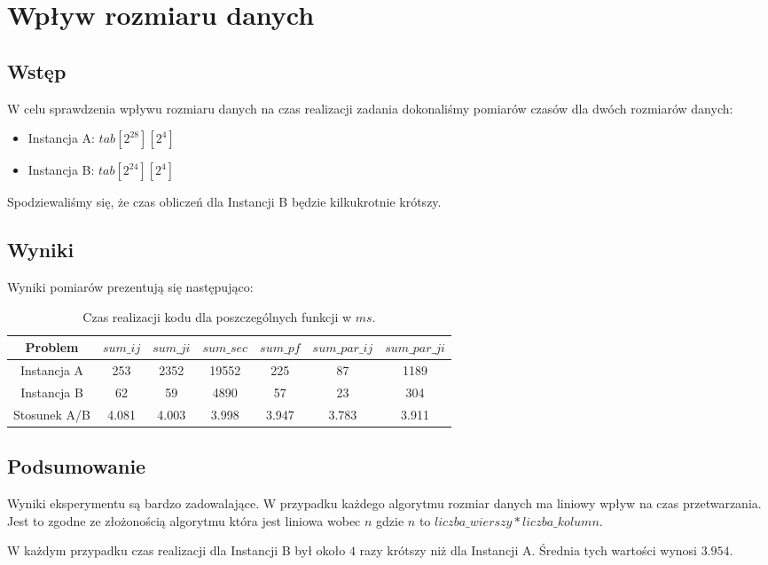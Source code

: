 \section{Wpływ rozmiaru danych}

\subsection{Wstęp}

W celu sprawdzenia wpływu rozmiaru danych na czas realizacji zadania dokonaliśmy pomiarów czasów dla dwóch rozmiarów danych:

\begin{itemize}
\item Instancja A: $tab[2^{28}][2^4]$
\item Instancja B: $tab[2^{24}][2^4]$
\end{itemize}

Spodziewaliśmy się, że czas obliczeń dla Instancji B będzie kilkukrotnie krótszy.

\subsection{Wyniki}

Wyniki pomiarów prezentują się następująco:

\begin{table}[!ht]
\caption{Czas realizacji kodu dla poszczególnych funkcji w $ms$.}
\begin{tabular}{|c|c|c|c|c|c|c|}

\hline
  Problem &
  $sum\_ij$ &
  $sum\_ji$ &
  $sum\_sec$ &
  $sum\_pf$ &
  $sum\_par\_ij$ &
  $sum\_par\_ji$ \\
\hline Instancja A &
  253 &
  2352 &
  19552 &
  225 &
  87 &
  1189 \\
\hline Instancja B &
  62 &
  59 &
  4890 &
  57 &
  23 &
  304 \\
\hline Stosunek A/B &
  4.081 &
  4.003 &
  3.998 &
  3.947 &
  3.783 &
  3.911 \\
\hline

\end{tabular}
\end{table}

\subsection{Podsumowanie}

Wyniki eksperymentu są bardzo zadowalające. W przypadku każdego algorytmu rozmiar danych ma liniowy wpływ na czas przetwarzania. Jest to zgodne ze złożonością algorytmu która jest liniowa wobec $n$ gdzie $n$ to $liczba\_wierszy * liczba\_kolumn$.\newline

W każdym przypadku czas realizacji dla Instancji B był około $4$ razy krótszy niż dla Instancji A. Średnia tych wartości wynosi $3.954$.
